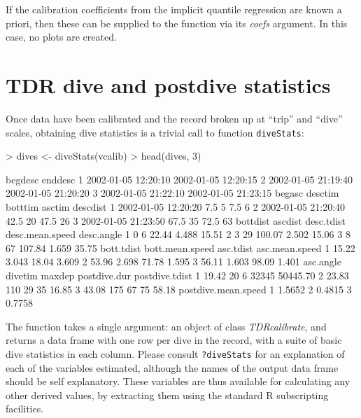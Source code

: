 \documentclass[12pt, letterpaper]{scrartcl}
\newcommand{\Rfunction}[1]{{\texttt{#1}}}
\newcommand{\Rclass}[1]{{\textit{#1}}}
\newcommand{\Rfunarg}[1]{{\textit{#1}}}
\newcommand{\R}{{\normalfont\textsf{R }}{}}
\begin{document}
If the calibration coefficients from the implicit quantile regression are
known a priori, then these can be supplied to the function via its
\Rfunarg{coefs} argument.  In this case, no plots are created.


\section{TDR dive and postdive statistics}
\label{sec:tdr-stats}

Once data have been calibrated and the record broken up at ``trip'' and
``dive'' scales, obtaining dive statistics is a trivial call to function
\Rfunction{diveStats}:

\begin{Schunk}
\begin{Sinput}
> dives <- diveStats(vcalib)
> head(dives, 3)
\end{Sinput}
\begin{Soutput}
              begdesc             enddesc
1 2002-01-05 12:20:10 2002-01-05 12:20:15
2 2002-01-05 21:19:40 2002-01-05 21:20:20
3 2002-01-05 21:22:10 2002-01-05 21:23:15
               begasc desctim botttim asctim descdist
1 2002-01-05 12:20:20     7.5       5    7.5        6
2 2002-01-05 21:20:40    42.5      20   47.5       26
3 2002-01-05 21:23:50    67.5      35   72.5       63
  bottdist ascdist desc.tdist desc.mean.speed desc.angle
1        0       6      22.44           4.488      15.51
2        3      29     100.07           2.502      15.06
3        8      67     107.84           1.659      35.75
  bott.tdist bott.mean.speed asc.tdist asc.mean.speed
1      15.22           3.043     18.04          3.609
2      53.96           2.698     71.78          1.595
3      56.11           1.603     98.09          1.401
  asc.angle divetim maxdep postdive.dur postdive.tdist
1     19.42      20      6        32345       50445.70
2     23.83     110     29           35          16.85
3     43.08     175     67           75          58.18
  postdive.mean.speed
1              1.5652
2              0.4815
3              0.7758
\end{Soutput}
\end{Schunk}

The function takes a single argument: an object of class
\Rclass{TDRcalibrate}, and returns a data frame with one row per dive in
the record, with a suite of basic dive statistics in each column.  Please
consult \verb|?diveStats| for an explanation of each of the variables
estimated, although the names of the output data frame should be self
explanatory.  These variables are thus available for calculating any other
derived values, by extracting them using the standard \R{} subscripting
facilities.
\end{document}
